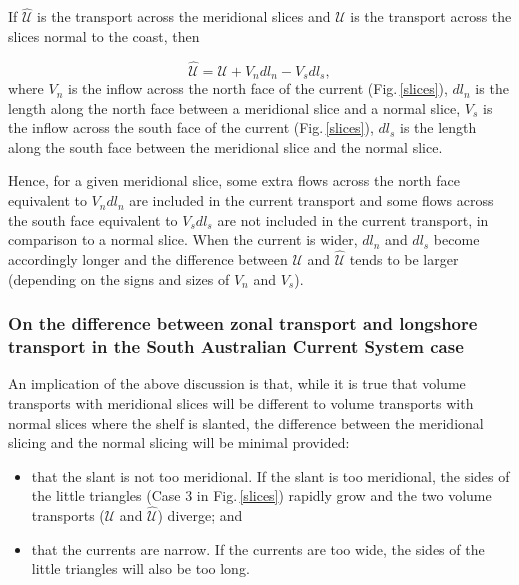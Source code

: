 \documentclass[preprint,3p,review,12pt]{elsarticle}
\begin{document}
If $\mathcal{\hat{U}}$ is the transport across the meridional slices and $\mathcal{U}$ is the transport across the slices normal to the coast, then

\begin{equation} \label{eq:20}
\mathcal{\hat{U}} = \mathcal{U} + V_{n}dl_{n} - V_{s}dl_{s},
\end{equation}
%
where $V_{n}$ is the inflow across the north face of the current (Fig.\,\ref{slices}), $dl_{n}$ is the length along the north face between a meridional slice and a normal slice, $V_{s}$ is the inflow across the south face of the current (Fig.\,\ref{slices}), $dl_{s}$ is the length along the south face between the meridional slice and the normal slice.

Hence, for a given meridional slice, some extra flows across the north face equivalent to $V_{n}dl_{n}$ are included in the current transport and some flows across the south face equivalent to $V_{s}dl_{s}$ are not included in the current transport, in comparison to a normal slice. When the current is wider, $dl_n$ and $dl_s$ become accordingly longer and the difference between $\mathcal{U}$ and $\hat{\mathcal{U}}$ tends to be larger (depending on the signs and sizes of $V_n$ and $V_s$).

\subsubsection{On the difference between zonal transport and longshore transport in the South Australian Current System case}
An implication of the above discussion is that, while it is true that volume transports with meridional slices will be different to volume transports with normal slices where the shelf is slanted, the difference between the meridional slicing and the normal slicing will be minimal provided:
%
\begin{itemize}
    \item that the slant is not too meridional. If the slant is too meridional, the sides of the little triangles (Case 3 in Fig.\,\ref{slices}) rapidly grow and the two volume transports ($\mathcal{U}$ and $\hat{\mathcal{U}}$) diverge; and
%
    \item that the currents are narrow. If the currents are too wide, the sides of the little triangles will also be too long.
\end{itemize}
\end{document}

